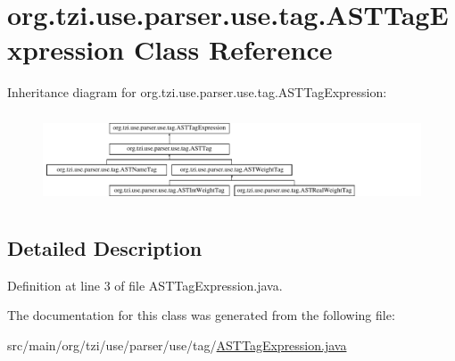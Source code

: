 \hypertarget{classorg_1_1tzi_1_1use_1_1parser_1_1use_1_1tag_1_1_a_s_t_tag_expression}{\section{org.\-tzi.\-use.\-parser.\-use.\-tag.\-A\-S\-T\-Tag\-Expression Class Reference}
\label{classorg_1_1tzi_1_1use_1_1parser_1_1use_1_1tag_1_1_a_s_t_tag_expression}
}
Inheritance diagram for org.\-tzi.\-use.\-parser.\-use.\-tag.\-A\-S\-T\-Tag\-Expression\-:\begin{figure}[H]
\begin{center}
\leavevmode
\includegraphics[height=2.695548cm]{classorg_1_1tzi_1_1use_1_1parser_1_1use_1_1tag_1_1_a_s_t_tag_expression}
\end{center}
\end{figure}


\subsection{Detailed Description}


Definition at line 3 of file A\-S\-T\-Tag\-Expression.\-java.



The documentation for this class was generated from the following file\-:\begin{DoxyCompactItemize}
\item 
src/main/org/tzi/use/parser/use/tag/\hyperlink{_a_s_t_tag_expression_8java}{A\-S\-T\-Tag\-Expression.\-java}\end{DoxyCompactItemize}
